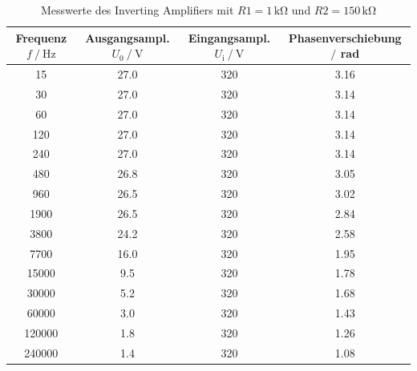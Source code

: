 \begin{table}
    \centering
    \caption{Messwerte des Inverting Amplifiers mit $R1=1\,\unit{\kilo\ohm}$ und $R2=150\,\unit{\kilo\ohm}$}
    \begin{tabular}{c c c c}
        \toprule
        Frequenz $f\mathbin{/}\unit{\hertz}$ & Ausgangsampl. $U_0\mathbin{/}\unit{\volt}$& Eingangsampl. $U_{\text{i}}\mathbin{/}\unit{\volt}$ & Phasenverschiebung $\mathbin{/}$ rad\\
        \midrule
        15& 27.0&	320&	3.16\\		
        30&	27.0&	320&	3.14\\		
        60&	27.0&	320&	3.14\\		
        120&	27.0&	320&	3.14\\		
        240&	27.0&	320&	3.14\\		
        480&	26.8&	320&	3.05\\		
        960&	26.5&	320&	3.02\\		
        1900&	26.5&	320&	2.84\\	
        3800&	24.2&	320&	2.58\\	
        7700&	16.0&	320&	1.95\\	
        15000&	9.5&	320&	1.78\\		
        30000&	5.2&	320&	1.68\\		
        60000&	3.0&	320&	1.43\\	
        120000&	1.8&	320&	1.26\\	
        240000&	1.4&	320& 1.08	\\
        \bottomrule
    \end{tabular}
    \label{tab:InvAmp3}
\end{table}

\newpage

